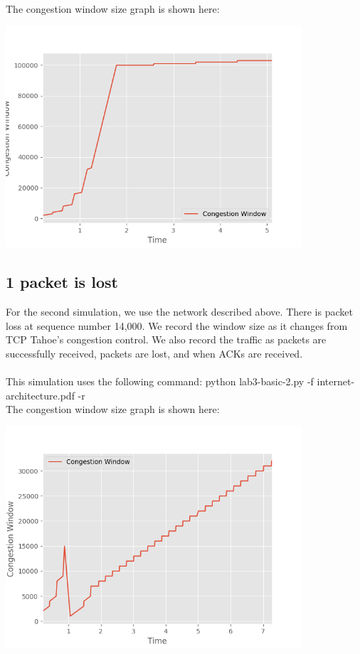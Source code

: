 \documentclass[fleqn,11pt]{article}
\begin{document}
The congestion window size graph is shown here:

\includegraphics[width=11cm]{cwnd1}\\

 \subsection{1 packet is lost}
For the second simulation, we use the network described above. There is packet loss at sequence number 14,000. We record the window size as it changes from TCP Tahoe's congestion control. We also record the traffic as packets are successfully received, packets are lost, and when ACKs are received. \\\\
This simulation uses the following command: python lab3-basic-2.py -f internet-architecture.pdf -r\\ 

The congestion window size graph is shown here:

\includegraphics[width=11cm]{cwnd2}\\
\end{document}
